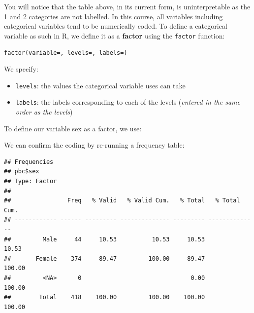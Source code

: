 \documentclass[
]{memoir}
\newenvironment{Shaded}{\begin{snugshade}}{\end{snugshade}}
\newcommand{\AttributeTok}[1]{\textcolor[rgb]{0.77,0.63,0.00}{#1}}
\newcommand{\DecValTok}[1]{\textcolor[rgb]{0.00,0.00,0.81}{#1}}
\newcommand{\FunctionTok}[1]{\textcolor[rgb]{0.00,0.00,0.00}{#1}}
\newcommand{\NormalTok}[1]{#1}
\newcommand{\OtherTok}[1]{\textcolor[rgb]{0.56,0.35,0.01}{#1}}
\newcommand{\SpecialCharTok}[1]{\textcolor[rgb]{0.00,0.00,0.00}{#1}}
\newcommand{\StringTok}[1]{\textcolor[rgb]{0.31,0.60,0.02}{#1}}
\providecommand{\tightlist}{%
  \setlength{\itemsep}{0pt}\setlength{\parskip}{0pt}}
\begin{document}
You will notice that the table above, in its current form, is uninterpretable as the 1 and 2 categories are not labelled. In this course, all variables including categorical variables tend to be numerically coded. To define a categorical variable as such in R, we define it as a \textbf{factor} using the \texttt{factor} function:

\texttt{factor(variable=,\ levels=,\ labels=)}

We specify:

\begin{itemize}
\tightlist
\item
  \texttt{levels}: the values the categorical variable uses can take
\item
  \texttt{labels}: the labels corresponding to each of the levels (\emph{entered in the same order as the levels})
\end{itemize}

To define our variable sex as a factor, we use:

\begin{Shaded}
\end{Shaded}

We can confirm the coding by re-running a frequency table:

\begin{Shaded}
\end{Shaded}

\begin{verbatim}
## Frequencies  
## pbc$sex  
## Type: Factor  
## 
##                Freq   % Valid   % Valid Cum.   % Total   % Total Cum.
## ------------ ------ --------- -------------- --------- --------------
##         Male     44     10.53          10.53     10.53          10.53
##       Female    374     89.47         100.00     89.47         100.00
##         <NA>      0                               0.00         100.00
##        Total    418    100.00         100.00    100.00         100.00
\end{verbatim}
\end{document}
